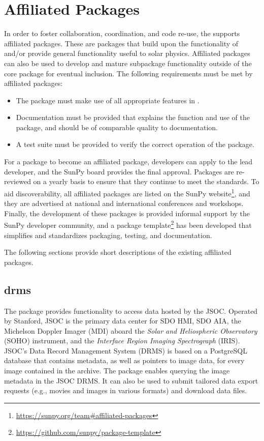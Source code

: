 \section{Affiliated Packages}
\label{sec:affil_package}

In order to foster collaboration, coordination, and code re-use, the \sunpyproj supports affiliated packages.
These are \python packages that build upon the functionality of \sunpypkg and/or provide general functionality useful to solar physics.
Affiliated packages can also be used to develop and mature subpackage functionality outside of the \sunpypkg core package for eventual inclusion.
The following requirements must be met by affiliated packages:
\begin{itemize}
    \item The package must make use of all appropriate features in \sunpypkg.
    \item Documentation must be provided that explains the function and use of the package, and should be of comparable quality to \sunpypkg documentation.
    \item A test suite must be provided to verify the correct operation of the package.
\end{itemize}
For a package to become an affiliated package, developers can apply to the lead developer, and the SunPy board provides the final approval.
Packages are re-reviewed on a yearly basis to ensure that they continue to meet the standards.
To aid discoverability, all affiliated packages are listed on the SunPy website\footnote{\url{https://sunpy.org/team\#affiliated-packages}}, and they are advertised at national and international conferences and workshops.
Finally, the development of these packages is provided informal support by the SunPy developer community, and
a package template\footnote{\url{https://github.com/sunpy/package-template}} has been developed that simplifies and standardizes packaging, testing, and documentation.

The following sections provide short descriptions of the existing affiliated packages.

\subsection{drms}
\label{sec:drms}

The  package provides functionality to access data hosted by the JSOC.
Operated by Stanford, JSOC is the primary data center for SDO HMI, SDO AIA, the Michelson Doppler Imager (MDI) aboard the \textit{Solar and Heliospheric Observatory} (SOHO) instrument, and the \textit{Interface Region Imaging Spectrograph} (IRIS).
JSOC's Data Record Management System (DRMS) is based on a PostgreSQL database that contains metadata, as well as pointers to image data, for every image contained in the archive.
The  package enables querying the image metadata in the JSOC DRMS.
It can also be used to submit tailored data export requests (e.g., movies and images in various formats) and download data files.

